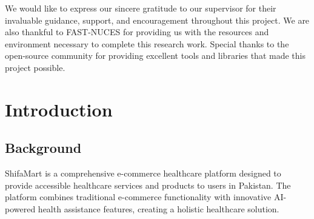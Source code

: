 \documentclass[12pt,a4paper]{article}
\begin{document}
\newpage
\tableofcontents
\newpage
\listoffigures
\newpage
\listoftables
\newpage

\begin{acknowledgements}
We would like to express our sincere gratitude to our supervisor for their invaluable guidance, support, and encouragement throughout this project. We are also thankful to FAST-NUCES for providing us with the resources and environment necessary to complete this research work. Special thanks to the open-source community for providing excellent tools and libraries that made this project possible.
\end{acknowledgements}

\begin{abstract}
This project presents ShifaMart, a comprehensive e-commerce healthcare platform that integrates an AI-powered symptom analysis and disease prediction system. The platform combines a MERN (MongoDB, Express.js, React, Node.js) stack frontend and backend with a Python-based AI microservice. The AI component employs an ensemble of XGBoost and Random Forest classifiers to predict diseases from symptoms with an accuracy of 92-96\%. It features advanced NLP capabilities for extracting symptoms from natural language, a dedicated severity detection model, comprehensive first-aid guidance, and specialist recommendations. The system architecture includes a FastAPI-based Python backend that serves as a microservice, connecting seamlessly with the Express.js backend through RESTful APIs. The conversational AI agent provides an intuitive interface for users to describe their symptoms in natural language and receive immediate medical guidance. The system addresses critical healthcare challenges by making medical information more accessible and providing preliminary health assessments, while maintaining appropriate disclaimers about the informational nature of the system.
\end{abstract}


\newpage
\chapter{Introduction}
\vspace{0.5cm}

\section{Background}
ShifaMart is a comprehensive e-commerce healthcare platform designed to provide accessible healthcare services and products to users in Pakistan. The platform combines traditional e-commerce functionality with innovative AI-powered health assistance features, creating a holistic healthcare solution.
\end{document}
